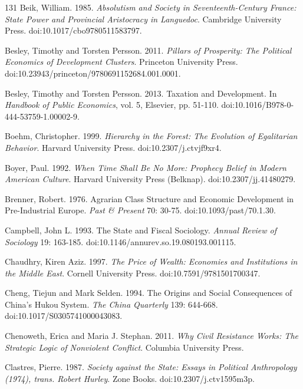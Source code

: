\documentclass[11pt,letterpaper]{article}
\theoremstyle{definition}
\theoremstyle{remark}
\begin{document}
\begin{thebibliography}{131}
Beik, William. 1985. \emph{Absolutism and Society in Seventeenth-Century France: State Power and Provincial Aristocracy in Languedoc}. Cambridge University Press. doi:10.1017/cbo9780511583797.

Besley, Timothy and Torsten Persson. 2011. \emph{Pillars of Prosperity: The Political Economics of Development Clusters}. Princeton University Press. doi:10.23943/princeton/9780691152684.001.0001.

Besley, Timothy and Torsten Persson. 2013. Taxation and Development. In \emph{Handbook of Public Economics}, vol. 5, Elsevier, pp. 51-110. doi:10.1016/B978-0-444-53759-1.00002-9.

Boehm, Christopher. 1999. \emph{Hierarchy in the Forest: The Evolution of Egalitarian Behavior}. Harvard University Press. doi:10.2307/j.ctvjf9xr4.

Boyer, Paul. 1992. \emph{When Time Shall Be No More: Prophecy Belief in Modern American Culture}. Harvard University Press (Belknap). doi:10.2307/jj.41480279.

Brenner, Robert. 1976. Agrarian Class Structure and Economic Development in Pre-Industrial Europe. \emph{Past \& Present} 70: 30-75. doi:10.1093/past/70.1.30.

Campbell, John L. 1993. The State and Fiscal Sociology. \emph{Annual Review of Sociology} 19: 163-185. doi:10.1146/annurev.so.19.080193.001115.

Chaudhry, Kiren Aziz. 1997. \emph{The Price of Wealth: Economies and Institutions in the Middle East}. Cornell University Press. doi:10.7591/9781501700347.

Cheng, Tiejun and Mark Selden. 1994. The Origins and Social Consequences of China's Hukou System. \emph{The China Quarterly} 139: 644-668. doi:10.1017/S0305741000043083.

Chenoweth, Erica and Maria J. Stephan. 2011. \emph{Why Civil Resistance Works: The Strategic Logic of Nonviolent Conflict}. Columbia University Press.

Clastres, Pierre. 1987. \emph{Society against the State: Essays in Political Anthropology (1974), trans. Robert Hurley}. Zone Books. doi:10.2307/j.ctv1595m3p.


\end{thebibliography}
\end{document}
